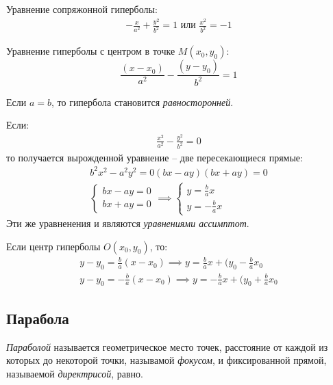 \begin{note}
  Уравнение сопряжонной гиперболы:
  \begin{gather*}
    \boxed{-\frac{x}{a^2} + \frac{y^2}{b^2} = 1} \text{ или } \boxed{\frac{x^2}{b^2} = -1} 
  \end{gather*} 

  Уравнение гиперболы с центром в точке $M(x_0, y_0)$: \[
  \frac{(x - x_0)}{a^2} - \frac{(y - y_0)}{b^2} = 1
  \] 

  Если $a = b$, то гипербола становится \textit{равносторонней}.

  Если: 
  \begin{gather*}
    \frac{x^2}{a^2} - \frac{y^2}{b^2} = 0
  \end{gather*}
  то получается вырожденной уравнение -- две пересекающиеся прямые:
  \begin{gather*}
    b^2x^2 - a^2y^2 = 0
    (bx - ay)(bx + ay) = 0 \\
    \begin{cases}
      bx - ay = 0 \\
      bx + ay = 0
    \end{cases} \implies 
    \begin{cases}
      y = \frac{b}{a} x \\
      y = - \frac{b}{a} x
    \end{cases}
  \end{gather*}
  Эти же уравненения и являются \textit{уравнениями ассимптот}. 
  
  Если центр гиперболы $O(x_0, y_0)$, то: 
  \begin{gather*}
  y - y_0 = \frac{b}{a}(x - x_0) \implies y = \frac{b}{a}x + (y_0 - \frac{b}{a}x_0 \\
  y - y_0 = -\frac{b}{a}(x - x_0) \implies y = -\frac{b}{a}x + (y_0 + \frac{b}{a}x_0
  \end{gather*}
\end{note}

\subsection{Парабола}

\begin{definition}
  \textit{Параболой} называется геометрическое место точек, расстояние от каждой из которых до некоторой точки, называмой \textit{фокусом}, и фиксированной прямой, называемой \textit{директрисой}, равно.
\end{definition}

